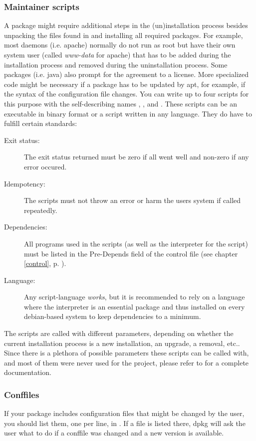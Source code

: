 \subsubsection{Maintainer scripts}
A package might require additional steps in the (un)installation process besides
unpacking the files found in  and installing all required
packages. For example, most daemons (i.e. apache) normally do not
run as root but have their own system user (called \emph{www-data} for apache)
that has to be added during the installation process and removed during the
uninstallation process. Some packages (i.e. java) also prompt for the agreement
to a license. More specialized code might be necessary if a package has to be
updated by apt, for example, if the syntax of the configuration file changes.
You can write up to four scripts for this purpose with the self-describing names
, ,  and . These scripts can
be an executable in binary format or a script written in any language. They do
have to fulfill certain standards:
\begin{description}
  \item[Exit status:] The exit status returned must be zero if all went well and
    non-zero if any error occured.
  \item[Idempotency:] The scripts must not throw an error or harm the users
    system if called repeatedly. 
  \item[Dependencies:] All programs used in the scripts (as well as the
    interpreter for the script) must be listed in the Pre-Depends field of the
    control file (see chapter \ref{control}, p. \pageref{control}).
  \item[Language:] Any script-language \emph{works}, but it is recommended to
    rely on a language where the interpreter is an essential package and thus
    installed on every debian-based system to keep dependencies to a minimum.
\end{description}
The scripts are called with different parameters, depending on whether the current
installation process is a new installation, an upgrade, a removal, etc..
Since there is a plethora of possible parameters these scripts can be called
with, and most of them were never used for the \tunix{} project, please refer to
\cite{debian policy manual} for a complete documentation.

\subsubsection{Conffiles}
If your package includes configuration files that might be changed by the user,
you should list them, one per line, in . If a file
is listed there, dpkg will ask the user what to do if a conffile was changed and
a new version is available. 

